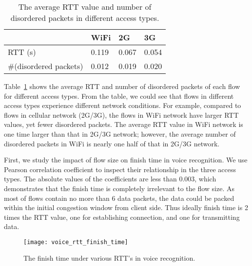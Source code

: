 
\begin{table}[th]
\caption{The average RTT value and number of disordered packets in different access types.}
\label{tab:voice_access_type_stats}
\centering
\renewcommand{\arraystretch}{1.2}
\begin{tabular}{l|l|l|l}
	\toprule
	& WiFi & 2G & 3G \\
	\midrule
	RTT (s) & 0.119 & 0.067 & 0.054 \\
	\hline
	\#(disordered packets) & 0.012 & 0.019 & 0.020 \\
	\bottomrule
\end{tabular}
\end{table}

Table~\ref{tab:voice_access_type_stats} shows the average RTT and number of disordered packets of each flow for different access types. From the table, we could see that flows in different access types experience different network conditions. For example, compared to flows in cellular network (2G/3G), the flows in WiFi network have larger RTT values, yet fewer disordered packets. The average RTT value in WiFi network is one time larger than that in 2G/3G network; however, the average number of disordered packets in WiFi is nearly one half of that in 2G/3G network.

First, we study the impact of flow size on finish time in voice recognition. We use Pearson correlation coefficient to inspect their relationship in the three access types. The absolute values of the coefficients are less than 0.003, which demonstrates that the finish time is completely irrelevant to the flow size. As most of flows contain no more than 6 data packets, the data could be packed within the initial congestion window from client side. Thus ideally finish time is 2 times the RTT value, one for establishing connection, and one for transmitting data.

\begin{figure}[!htbp]
\centering
	\texttt{[image: voice\_rtt\_finish\_time]}
\caption{The finish time under various RTT's in voice recognition.}
\label{fig:voice_rtt_finish_time}
\end{figure}

